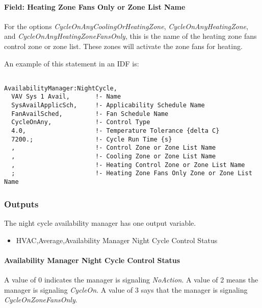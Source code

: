 \paragraph{Field: Heating Zone Fans Only or Zone List Name}\label{field-heating-zone-fans-only-or-zone-list-name}

For the options \emph{CycleOnAnyCoolingOrHeatingZone}, \emph{CycleOnAnyHeatingZone}, and \emph{CycleOnAnyHeatingZoneFansOnly},  this is the name of the heating zone fans control zone or zone list. These zones will activate the zone fans for heating.

An example of this statement in an IDF is:

\begin{lstlisting}

AvailabilityManager:NightCycle,
  VAV Sys 1 Avail,       !- Name
  SysAvailApplicSch,     !- Applicability Schedule Name
  FanAvailSched,         !- Fan Schedule Name
  CycleOnAny,            !- Control Type
  4.0,                   !- Temperature Tolerance {delta C}
  7200.;                 !- Cycle Run Time {s}
  ,                      !- Control Zone or Zone List Name
  ,                      !- Cooling Zone or Zone List Name
  ,                      !- Heating Control Zone or Zone List Name
  ;                      !- Heating Zone Fans Only Zone or Zone List Name
\end{lstlisting}

\subsubsection{Outputs}\label{outputs-2-022}

The night cycle availability manager has one output variable.

\begin{itemize}
\tightlist
\item
  HVAC,Average,Availability Manager Night Cycle Control Status
\end{itemize}

\paragraph{Availability Manager Night Cycle Control Status}\label{availability-manager-night-cycle-control-status}

A value of 0 indicates the manager is signaling \emph{NoAction}. A value of 2 means the manager is signaling \emph{CycleOn}. A value of 3 says that the manager is signaling \emph{CycleOnZoneFansOnly}.


